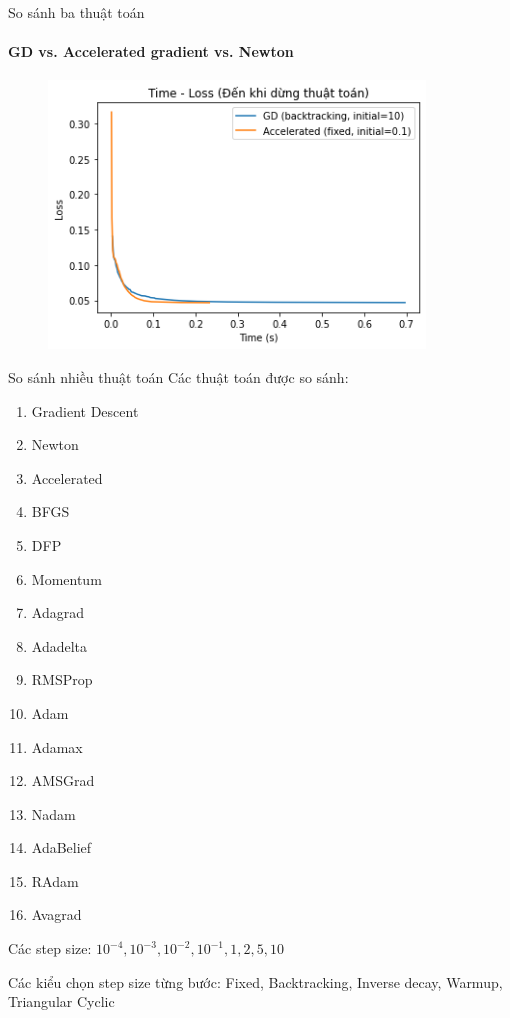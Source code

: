 \documentclass[10pt]{beamer}
\theoremstyle{remark}
\theoremstyle{definition}
\begin{document}
\begin{frame}{So sánh ba thuật toán}
	\framesubtitle{GD vs. Accelerated gradient vs. Newton}
	\begin{figure}[h!]
		\centering
		\includegraphics[width=10cm]{Thinh/24.png}
	\end{figure}
\end{frame}

\begin{frame}{So sánh nhiều thuật toán}
	Các thuật toán được so sánh:
	\begin{multicols}{3}
	\begin{enumerate}
		\item Gradient Descent
  		\item Newton
    	\item Accelerated
     	\item BFGS
      	\item DFP
        \item Momentum
        \item Adagrad
        \item Adadelta
        \item RMSProp
        \item Adam
        \item Adamax
        \item AMSGrad
        \item Nadam
        \item AdaBelief
        \item RAdam
        \item Avagrad    
	\end{enumerate}
	\end{multicols}
	Các step size: $10^{-4}, 10^{-3}, 10^{-2}, 10^{-1}, 1, 2, 5, 10$
	
	Các kiểu chọn step size từng bước: Fixed, Backtracking, Inverse decay, Warmup, Triangular Cyclic

\end{frame}
\end{document}
